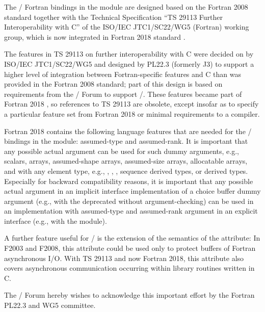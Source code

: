 The \MPI/ Fortran bindings in the  module are designed based on
the Fortran 2008 standard \cite{fortran2008} together with the
Technical Specification ``TS 29113 Further Interoperability with C''
\cite{fortran2008:ts29113-interop}
of the ISO/IEC JTC1/SC22/WG5 (Fortran) working group, 
which is now integrated in Fortran 2018 standard \cite{fortran2018}.

\begin{rationale}
The features in TS 29113 on further interoperability
with C were decided on by
ISO/IEC JTC1/SC22/WG5 and designed by PL22.3 (formerly J3) to support a higher level of integration
between Fortran-specific features and C than was provided in the Fortran 2008 standard;
part of this design is based on requirements from the \MPI/ Forum to support \MPIIIIDOTO/.
These features became part of Fortran 2018 \cite{fortran2018}, so references
to TS 29113 are obsolete, except insofar as to specify
a particular feature set from Fortran 2018 or minimal requirements to a compiler.

Fortran 2018 contains the following language features
that are needed for the \MPI/ bindings
in the  module: assumed-type and assumed-rank.
It is important that any possible actual argument can be used
for such dummy arguments, e.g., scalars, arrays, assumed-shape arrays, assumed-size arrays,
allocatable arrays, and with any element type, e.g., ,
, , sequence derived types, or  derived types.
Especially for backward compatibility reasons,
it is important that any possible actual argument
in an implicit interface implementation of a choice buffer dummy argument
(e.g., with the deprecated  without argument-checking)
can be used in an implementation with assumed-type and assumed-rank
argument in an explicit interface (e.g., with the  module).

A further feature useful for \MPI/ is the extension of the
semantics of the  attribute:
In F2003 and F2008, this attribute could be used only to
protect buffers of Fortran asynchronous I/O.
With TS 29113 and now Fortran 2018, this attribute also covers
asynchronous communication
occurring within library routines written in C.

The \MPI/ Forum hereby wishes to acknowledge this
important effort by the Fortran PL22.3 and WG5 committee.
\end{rationale}


